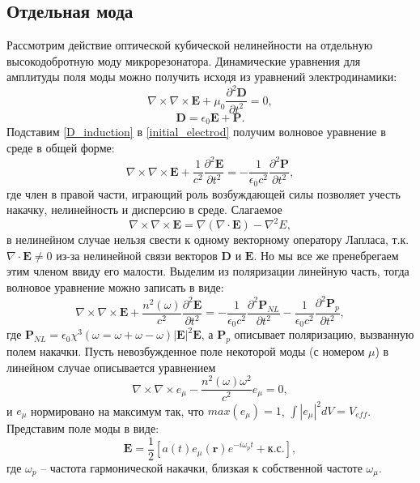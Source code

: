\subsection{Отдельная мода}
Рассмотрим действие оптической кубической нелинейности на отдельную высокодобротную моду микрорезонатора. Динамические уравнения для амплитуды поля моды можно получить исходя из уравнений электродинамики:
\begin{equation}\label{initial_electrod}
\nabla\times\nabla\times\textbf{E}+\mu_0\frac{\partial^2\textbf{D}}{\partial t^2}=0,
\end{equation}
\begin{equation}\label{D_induction}
\textbf{D}=\epsilon_0\textbf{E}+\textbf{P}.
\end{equation}
Подставим \eqref{D_induction} в \eqref{initial_electrod} получим волновое уравнение в среде в общей форме:
\begin{equation}
\nabla\times\nabla\times\textbf{E}+\frac{1}{c^2}\frac{\partial^2\textbf{E}}{\partial t^2}=-\frac{1}{\epsilon_0c^2}\frac{\partial^2\textbf{P}}{\partial t^2},
\end{equation}
где член в правой части, играющий роль возбуждающей силы позволяет учесть накачку, нелинейность и дисперсию в среде.
Слагаемое
\begin{equation}
\nabla\times\nabla\times\textbf{E}=\nabla(\nabla\cdot \textbf{E})-\nabla^2E,
\end{equation}
в нелинейном случае нельзя свести к одному векторному оператору Лапласа, т.к. $\nabla\cdot\textbf{E}\neq0$ из-за нелинейной связи векторов $\textbf{D}$ и $\textbf{E}$. Но мы все же пренебрегаем этим членом ввиду его малости. Выделим из поляризации линейную часть, тогда волновое уравнение можно записать в виде:
\begin{equation}\label{wave_eq_polarization}
\nabla\times\nabla\times\textbf{E}+\frac{n^2(\omega)}{c^2}\frac{\partial^2\textbf{E}}{\partial t^2} =-\frac{1}{\epsilon_0c^2}\frac{\partial^2\textbf{P}_{NL}}{\partial t^2}-\frac{1}{\epsilon_0c^2}\frac{\partial^2\textbf{P}_{p}}{\partial t^2},
\end{equation}
где $\textbf{P}_{NL}=\epsilon_0\chi^3(\omega=\omega+\omega-\omega)|\textbf{E}|^2\textbf{E}$, а $\textbf{P}_p$ описывает поляризацию, вызванную полем накачки.
Пусть невозбужденное поле некоторой моды (с номером $\mu$) в линейном случае описывается уравнением
\begin{equation}\label{Helmholz}
\nabla\times\nabla\times\textbf{$e_\mu$}-\frac{n^2(\omega)\omega^2}{c^2}\textbf{$e_\mu$}=0,
\end{equation}
и $e_\mu$ нормировано на максимум так, что $max(e_\mu)=1$, $\int|e_\mu|^2dV=V_{eff}$. Представим поле моды в виде:
\begin{equation}
\textbf{E}=\frac{1}{2}[a(t)\textbf{$e_\mu$}(\textbf{r})e^{-i\omega_pt}+\text{к.с.}],
\end{equation}
где $\omega_p$ -- частота гармонической накачки, близкая к собственной частоте $\omega_\mu$.

